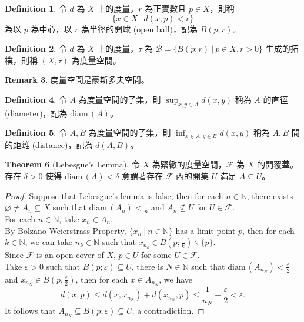 \documentclass[12pt]{article}
\theoremstyle{definition}
\newtheorem{definition}{Definition}[section]
\newtheorem{theorem}[definition]{Theorem}
\newtheorem{remark}[definition]{Remark}
\newcommand\<{\langle}
\renewcommand\>{\rangle}
\newcommand\diam{\mathrm{diam}\hspace{2pt}}
\begin{document}
\begin{CJK}{UTF8}{bsmi}
\begin{definition}
    令 $d$ 為 $X$ 上的度量，$r$ 為正實數且 $p\in X$，則稱
    \[
        \{x\in X\ |\ d(x, p)<r\}
    \]
    為以 $p$ 為中心，以 $r$ 為半徑的開球 (open ball)，記為 $B(p; r)$。
\end{definition}

\begin{definition}
    令 $d$ 為 $X$ 上的度量，$\tau$ 為 $\mathcal{B}=\{B(p; r)\ |\ p\in X, r>0\}$ 生成的拓樸，則稱 $(X, \tau)$ 為度量空間。
\end{definition}

\begin{remark}
    度量空間是豪斯多夫空間。
\end{remark}

\begin{definition}
    令 $A$ 為度量空間的子集，則 $\sup_{x, y\in A}d(x, y)$ 稱為 $A$ 的直徑 (diameter)，記為 $\diam(A)$。
\end{definition}

\begin{definition}
    令 $A, B$ 為度量空間的子集，則 $\inf_{x\in A, y\in B}d(x, y)$ 稱為 $A, B$ 間的距離 (distance)，記為 $d(A, B)$。
\end{definition}

\begin{theorem}[Lebesgue's Lemma]
    令 $X$ 為緊緻的度量空間，$\mathcal{F}$ 為 $X$ 的開覆蓋。存在 $\delta>0$ 使得 $\diam(A)<\delta$ 意謂著存在 $\mathcal{F}$ 內的開集 $U$ 滿足 $A\subseteq U$。
\end{theorem}
\begin{proof}
    Suppose that Lebesgue's lemma is false, then for each $n\in\mathbb{N}$, there exists $\varnothing\ne A_n\subseteq X$ such that $\diam(A_n)<\frac{1}{n}$ and $A_n\not\subseteq U$ for $U\in\mathcal{F}$. \\
    For each $n\in\mathbb{N}$, take $x_n\in A_n$. \\
    By Bolzano-Weierstrass Property, $\{x_n\ |\ n\in\mathbb{N}\}$ has a limit point $p$, then for each $k\in\mathbb{N}$, we can take $n_k\in\mathbb{N}$ such that $x_{n_k}\in B(p; \frac{1}{k})\backslash\{p\}$. \\
    Since $\mathcal{F}$ is an open cover of $X$, $p\in U$ for some $U\in\mathcal{F}$. \\
    Take $\varepsilon>0$ such that $B(p; \varepsilon)\subseteq U$, there is $N\in\mathbb{N}$ such that $\diam(A_{n_N})<\frac{\varepsilon}{2}$ and $x_{n_N}\in B(p, \frac{\varepsilon}{2})$, then for each $x\in A_{n_N}$, we have
    \[
        d(x, p)
        \le d(x, x_{n_N}) + d(x_{n_N}, p)
        \le \frac{1}{n_N} + \frac{\varepsilon}{2}
        <\varepsilon.
    \]
    It follows that $A_{n_N}\subseteq B(p; \varepsilon)\subseteq U$, a contradiction.
\end{proof}


\end{CJK}
\end{document}

